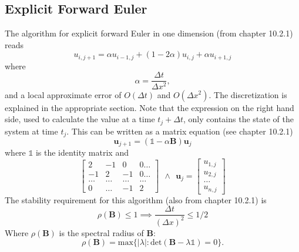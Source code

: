 \documentclass[reprint, english,notitlepage,nofootinbib]{revtex4-1}  %
\begin{document}
\subsection*{Explicit Forward Euler}

The algorithm for explicit forward Euler in one dimension (from \cite{lectures2015} chapter 10.2.1) reads
\begin{equation}
  \label{eq:forward_euler}
	u_{i, j+1} = \alpha u_{i-1, j} + (1 - 2\alpha) u_{i,j} + \alpha u_{i+1, j}
\end{equation}
where
\begin{equation*}
	\alpha = \frac{\Delta t}{\Delta x^2},
\end{equation*}
and a local approximate error of $O(\Delta t)$ and $O(\Delta x ^2)$. The discretization is explained in the appropriate section. Note that the expression on the right hand side, used to calculate the value at a time $t_j + \Delta t$, only contains the state of the system at time $t_j$. This can be written as a matrix equation (see \cite{lectures2015} chapter 10.2.1)
\begin{equation*}
	\mathbf{u}_{j+1} = (\mathds{1} - \alpha \mathbf{B})\mathbf{u}_j
\end{equation*}
where $\mathds{1}$ is the identity matrix and
\begin{equation*}
	\begin{bmatrix}
	2 & -1 & 0 & 0\dots \\
	-1 & 2 & -1 & 0\dots\\
	\dots & \dots & \dots &\dots \\
	0 & \dots & -1 & 2
	\end{bmatrix}	 \ \ \wedge \ \
	\mathbf{u}_{j} = \begin{bmatrix}
	u_{1,j} \\
	u_{2,j} \\
	\ldots \\
	u_{n,j}
	\end{bmatrix}
\end{equation*}
The stability requirement for this algorithm (also from \cite{lectures2015} chapter 10.2.1) is
\begin{equation}
	\label{eq:von_neumann_stability}
	\rho(\mathbf{B}) \le 1 \implies \frac{\Delta t}{(\Delta x)^2} \le 1/2
\end{equation}
Where $\rho(\mathbf{B})$ is the spectral radius of $\mathbf{B}$:
\begin{equation*}
	\rho(\mathbf{B}) = \text{max}\{|\lambda|:\text{det}(\mathbf{B}- \lambda \mathds{1}) = 0\}.
\end{equation*}
\end{document}
